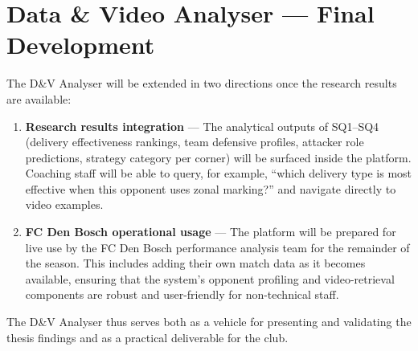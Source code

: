 \section{Data \& Video Analyser — Final Development}
\label{sec:plan_dv}

The D\&V Analyser will be extended in two directions once the research
results are available:

\begin{enumerate}
  \item \textbf{Research results integration} — The analytical outputs
        of SQ1--SQ4 (delivery effectiveness rankings, team defensive
        profiles, attacker role predictions, strategy category per
        corner) will be surfaced inside the platform. Coaching staff
        will be able to query, for example, ``which delivery type is
        most effective when this opponent uses zonal marking?'' and
        navigate directly to video examples.
  \item \textbf{FC Den Bosch operational usage} — The platform will be
        prepared for live use by the FC Den Bosch performance analysis
        team for the remainder of the season. This includes adding their
        own match data as it becomes available, ensuring that the
        system's opponent profiling and video-retrieval components are
        robust and user-friendly for non-technical staff.
\end{enumerate}

The D\&V Analyser thus serves both as a vehicle for presenting and
validating the thesis findings and as a practical deliverable for the
club.
